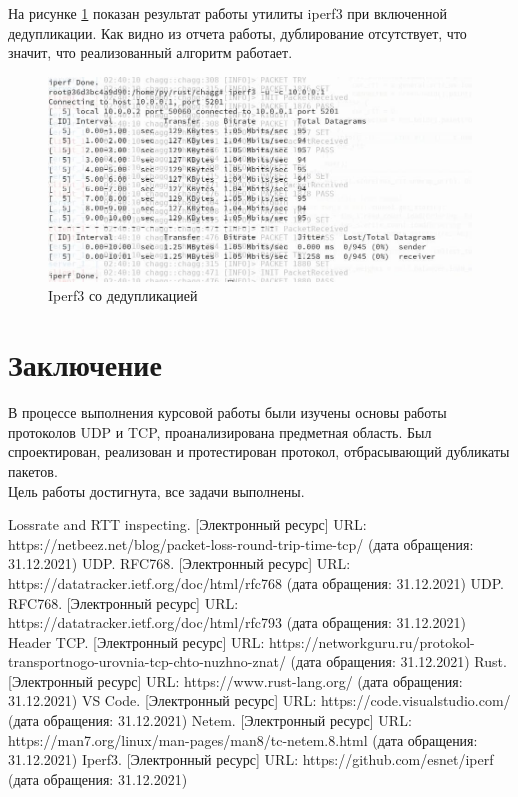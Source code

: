 \documentclass[14pt, a4paper]{extarticle}
\begin{document}
На рисунке \ref{reson} показан результат работы утилиты iperf3 при включенной дедупликации. Как видно из отчета работы, дублирование отсутствует, что значит, что реализованный алгоритм работает.
\begin{figure}[H]
	\centering
	\includegraphics[scale=0.7]{reson.jpg}
	\caption{Iperf3 со дедупликацией}
	\label{reson}
\end{figure}

\clearpage
\section*{Заключение}
В процессе выполнения курсовой работы были изучены основы работы протоколов UDP и TCP, проанализирована предметная область. Был спроектирован, реализован и протестирован протокол, отбрасывающий дубликаты пакетов. \\
\indent Цель работы достигнута, все задачи выполнены. 
\clearpage
\begin{thebibliography}{9}
	 Lossrate and RTT inspecting. [Электронный ресурс] URL: https://netbeez.net/blog/packet-loss-round-trip-time-tcp/ (дата обращения: 31.12.2021)
	 UDP. RFC768. [Электронный ресурс] URL: https://datatracker.ietf.org/doc/html/rfc768 (дата обращения: 31.12.2021)
	 UDP. RFC768. [Электронный ресурс] URL: https://datatracker.ietf.org/doc/html/rfc793 (дата обращения: 31.12.2021)
	 Header TCP. [Электронный ресурс] URL: https://networkguru.ru/protokol-transportnogo-urovnia-tcp-chto-nuzhno-znat/ (дата обращения: 31.12.2021)
	 Rust. [Электронный ресурс] URL: https://www.rust-lang.org/ (дата обращения: 31.12.2021)
	 VS Code. [Электронный ресурс] URL: https://code.visualstudio.com/ (дата обращения: 31.12.2021)
	 Netem. [Электронный ресурс] URL: https://man7.org/linux/man-pages/man8/tc-netem.8.html (дата обращения: 31.12.2021)
	 Iperf3. [Электронный ресурс] URL: https://github.com/esnet/iperf (дата обращения: 31.12.2021)
	
\end{thebibliography}
\end{document}
